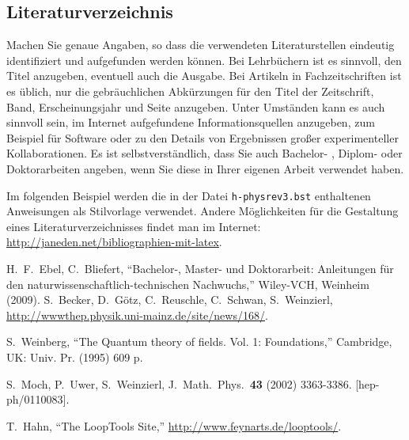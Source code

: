 \documentclass[a4paper,11pt,oneside,final,german,openbib,pdftex]{scrbook}
\begin{document}
\begin{appendix}
\chapter{Literaturverzeichnis}

Machen Sie genaue Angaben, so dass die verwendeten Literaturstellen 
eindeutig identifiziert und aufgefunden werden k\"onnen.
Bei Lehrb\"uchern \cite{Weinberg:1995mt} ist es sinnvoll, 
den Titel anzugeben, eventuell auch die Ausgabe. Bei Artikeln in 
Fachzeitschriften \cite{Moch:2001zr} ist es \"ublich, nur die 
gebr\"auchlichen Abk\"urzungen f\"ur den Titel der Zeitschrift, Band, 
Erscheinungsjahr und Seite anzugeben. Unter Umst\"anden kann es auch 
sinnvoll sein, im Internet aufgefundene Informationsquellen anzugeben, 
zum Beispiel f\"ur Software \cite{LoopTools} oder zu den Details von 
Ergebnissen gro{\ss}er experimenteller Kollaborationen. Es ist 
selbstverst\"andlich, dass Sie auch Bachelor- \cite{BA:Freund}, 
Diplom- oder Doktorarbeiten angeben, wenn Sie diese in Ihrer eigenen 
Arbeit verwendet haben.
\medskip

Im folgenden Beispiel werden die in der Datei {\tt h-physrev3.bst} 
enthaltenen Anweisungen als Stilvorlage verwendet. Andere 
M\"oglichkeiten f\"ur die Gestaltung eines Literaturverzeichnisses 
findet man im Internet: \url{http://janeden.net/bibliographien-mit-latex}.

\renewcommand{\bibname}{\bfont Literaturverzeichnis} 

\begin{thebibliography}{99}

H.\ F.\ Ebel, C.\ Bliefert, 
  ``Bachelor-, Master- und Doktorarbeit: Anleitungen f\"ur den 
  naturwissenschaftlich-technischen Nachwuchs,''
  Wiley-VCH, Weinheim (2009). 
  S.~Becker, D.~G\"otz, C.~Reuschle, C.~Schwan, S.~Weinzierl,  
  \url{http://wwwthep.physik.uni-mainz.de/site/news/168/}.

  S.~Weinberg,
  ``The Quantum theory of fields. Vol. 1: Foundations,''
  Cambridge, UK: Univ. Pr. (1995) 609 p.

  S.~Moch, P.~Uwer, S.~Weinzierl,
  J.\ Math.\ Phys.\  {\bf 43 } (2002)  3363-3386.
  [hep-ph/0110083].

  T.~Hahn, 
  ``The LoopTools Site,''
  \url{http://www.feynarts.de/looptools/}.


\end{thebibliography}
\end{appendix}
\end{document}
